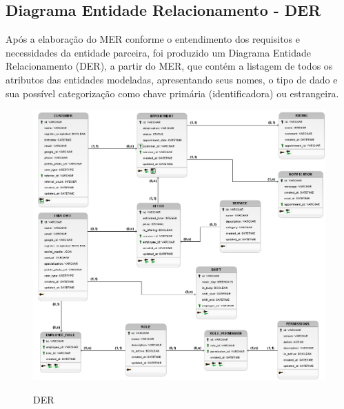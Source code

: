 \subsection{Diagrama Entidade Relacionamento - DER}
Após a elaboração do MER conforme o entendimento dos requisitos e necessidades da entidade parceira, foi produzido um Diagrama Entidade Relacionamento (DER), a partir do MER, que contém a listagem de todos os atributos das entidades modeladas, apresentando seus nomes, o tipo de dado e sua possível categorização como chave primária (identificadora) ou estrangeira.
\begin{figure}[h!tbp]
	\centering
	\caption{DER}
	\includegraphics[width=1\textwidth]{cap04-desenvolvimento/images/4-7-2-diagrama-entidade-relacionamento.png}
	\label{fig:der}
\end{figure}
